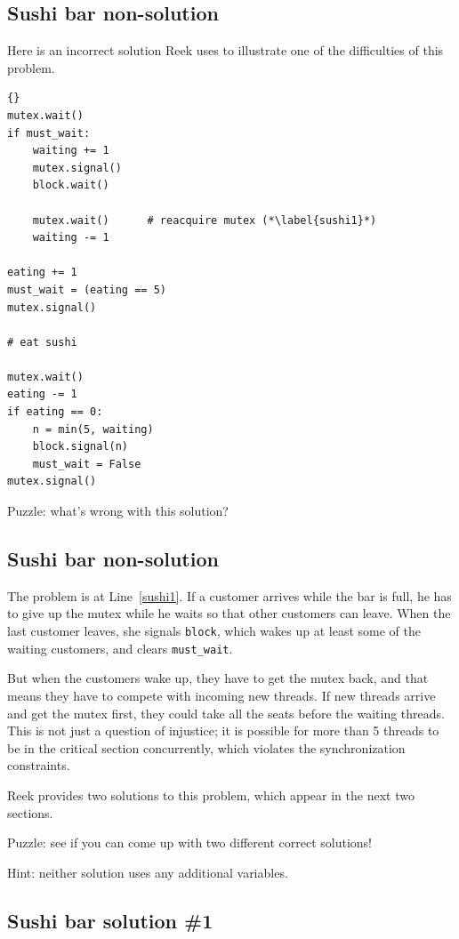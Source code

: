 \documentclass{book}
\newcommand{\clearemptydoublepage}{\newpage\cleardoublepage}
\begin{document}
\clearemptydoublepage
\subsection {Sushi bar non-solution}

Here is an incorrect solution Reek uses to illustrate one
of the difficulties of this problem.

\begin{lstlisting}[title={Sushi bar non-solution}]{}
mutex.wait()
if must_wait:
    waiting += 1
    mutex.signal()
    block.wait()

    mutex.wait()      # reacquire mutex (*\label{sushi1}*)
    waiting -= 1

eating += 1
must_wait = (eating == 5)
mutex.signal()

# eat sushi

mutex.wait()
eating -= 1
if eating == 0:
    n = min(5, waiting)
    block.signal(n)
    must_wait = False
mutex.signal()
\end{lstlisting}

Puzzle: what's wrong with this solution?


\clearemptydoublepage
\subsection {Sushi bar non-solution}

The problem is at Line~\ref{sushi1}.  If a customer arrives
while the bar is full, he has to give up the mutex while he
waits so that other customers can leave.  When the last customer
leaves, she signals {\tt block}, which wakes up at least some
of the waiting customers, and clears {\tt must\_wait}.

But when the customers wake up, they have to get the mutex
back, and that means they have to compete with incoming new
threads.  If new threads arrive and get the mutex first,
they could take all the seats before the waiting threads.
This is not just a question of injustice; it is possible for more
than 5 threads to be in the critical section concurrently, which
violates the synchronization constraints.

Reek provides two solutions to this problem, which appear
in the next two sections.

Puzzle: see if you can come up with two different correct solutions!

Hint: neither solution uses any additional variables.

\clearemptydoublepage
\subsection {Sushi bar solution \#1}
\end{document}
